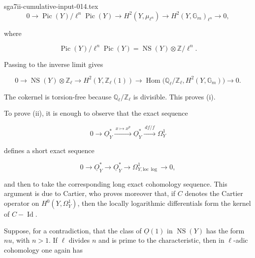 \begin{filecontents*}{sga7ii-cumulative-input-014.tex}
\begin{equation*}
0\longrightarrow
\operatorname{Pic}(Y)/\ell^n\operatorname{Pic}(Y)
\longrightarrow H^2(Y,\mu_{\ell^n})
\longrightarrow H^2(Y,\mathbb G_m)_{\ell^n}
\longrightarrow0,
\end{equation*}

where

\begin{equation*}
\operatorname{Pic}(Y)/\ell^n\operatorname{Pic}(Y)
=\operatorname{NS}(Y)\otimes\mathbb Z/\ell^n.
\end{equation*}

Passing to the inverse limit gives

\begin{equation*}
0\longrightarrow\operatorname{NS}(Y)\otimes\mathbb Z_\ell
\longrightarrow H^2(Y,\mathbb Z_\ell(1))
\longrightarrow
\operatorname{Hom}\bigl(\mathbb Q_\ell/\mathbb Z_\ell,
H^2(Y,\mathbb G_m)\bigr)
\longrightarrow0.
\end{equation*}

The cokernel is torsion-free because $\mathbb Q_\ell/\mathbb Z_\ell$ is
divisible.  This proves (i).

To prove (ii), it is enough to observe that the exact sequence

\begin{equation*}
0\longrightarrow\underline O_Y^*
\xrightarrow{\ x\mapsto x^p\ }\underline O_Y^*
\xrightarrow{\ df/f\ }\Omega_Y^1
\end{equation*}

defines a short exact sequence

\begin{equation*}
0\longrightarrow\underline O_Y^*\longrightarrow\underline O_Y^*
\longrightarrow\Omega^1_{Y,\mathrm{loc}\,\log}\longrightarrow0,
\end{equation*}

and then to take the corresponding long exact cohomology sequence.  This
argument is due to Cartier, who proves moreover that, if $C$ denotes the
Cartier operator on $H^0(Y,\Omega_Y^1)$, then the locally logarithmic
differentials form the kernel of $C-\operatorname{Id}$.

Suppose, for a contradiction, that the class of $\underline O(1)$ in
$\operatorname{NS}(Y)$ has the form $nu$, with $n>1$.  If $\ell$ divides
$n$ and is prime to the characteristic, then in $\ell$-adic cohomology one
again has



\end{filecontents*}
